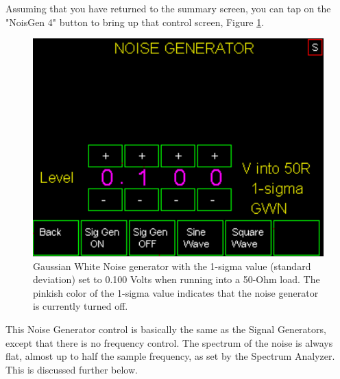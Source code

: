 Assuming that you have returned to the summary screen, you can tap on the "NoisGen 4" button to bring up that control screen, Figure  \ref{AVNA_024-label}.
\begin{figure}[H]
\begin{center}
\includegraphics[scale=0.75]{./images/AVNA_024.pdf}
\caption{Gaussian White Noise generator with the 1-sigma value (standard deviation) set to 0.100 Volts when running into a 50-Ohm load.  The pinkish color of the 1-sigma value indicates that the noise generator is currently turned off.}
\label{AVNA_024-label}
\end{center}
\end{figure}
%
This Noise Generator control is basically the same as the Signal Generators, except that there is no frequency control.  The spectrum of the noise is always flat, almost up to half the sample frequency, as set by the Spectrum Analyzer.  This is discussed further below.


